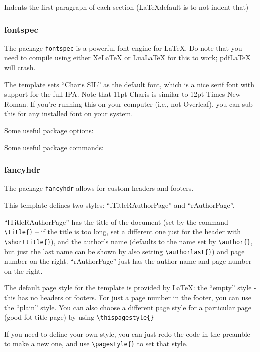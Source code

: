 \documentclass[12pt]{article}
\begin{document}
    Indents the first paragraph of each section (\LaTeX default is to not indent that)

\subsubsection{fontspec}

    The package \texttt{fontspec} is a powerful font engine for \LaTeX. Do note that you need to compile using either XeLaTeX or LuaLaTeX for this to work; pdfLaTeX will crash. 

    The template sets ``Charis SIL'' as the default font, which is a nice serif font with support for the full IPA. Note that 11pt Charis is similar to 12pt Times New Roman. If you're running this on your computer (i.e., not Overleaf), you can sub this for any installed font on your system. 

    Some useful package options:

    Some useful package commands:

\subsubsection{fancyhdr}

    The package \texttt{fancyhdr} allows for custom headers and footers. 

    This template defines two styles: ``lTitleRAuthorPage'' and ``rAuthorPage''. 
    
    ``lTitleRAuthorPage'' has the title of the document (set by the command \texttt{\textbackslash title\{\}} -- if the title is too long, set a different one just for the header with \texttt{\textbackslash shorttitle\{\}}), and the author's name (defaults to the name set by \texttt{\textbackslash author\{\}}, but just the last name can be shown by also setting \texttt{\textbackslash authorlast\{\}}) and page number on the right. ``rAuthorPage'' just has the author name and page number on the right. 

    The default page style for the template is provided by \LaTeX: the ``empty'' style - this has no headers or footers. For just a page number in the footer, you can use the ``plain'' style. You can also choose a different page style for a particular page (good fot title page) by using \texttt{\textbackslash thispagestyle\{\}}

    If you need to define your own style, you can just redo the code in the preamble to make a new one, and use \texttt{\textbackslash pagestyle\{\}} to set that style. 
\end{document}
